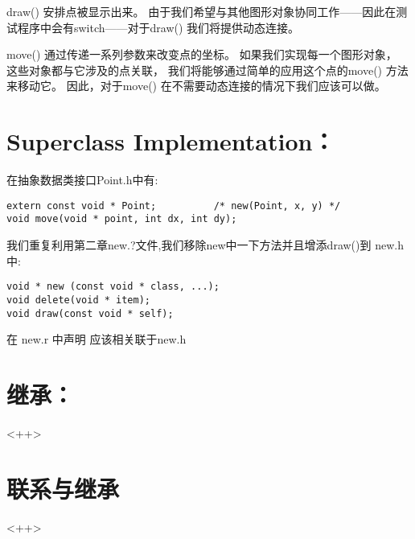 draw() 安排点被显示出来。
由于我们希望与其他图形对象协同工作——因此在测试程序中会有switch——对于draw() 
我们将提供动态连接。


move() 通过传递一系列参数来改变点的坐标。
如果我们实现每一个图形对象，
这些对象都与它涉及的点关联，
我们将能够通过简单的应用这个点的move() 方法来移动它。
因此，对于move() 在不需要动态连接的情况下我们应该可以做。

\section{Superclass Implementation：}
在抽象数据类接口Point.h中有:

\begin{lstlisting}
extern const void * Point;			/* new(Point, x, y) */
void move(void * point, int dx, int dy);
\end{lstlisting}

我们重复利用第二章new.?文件,我们移除new中一下方法并且增添draw()到 new.h中:
\begin{lstlisting}
void * new (const void * class, ...);
void delete(void * item);
void draw(const void * self);
\end{lstlisting}

在 new.r 中声明  应该相关联于new.h 





\section{继承：}<++>

\section{联系与继承}<++>

